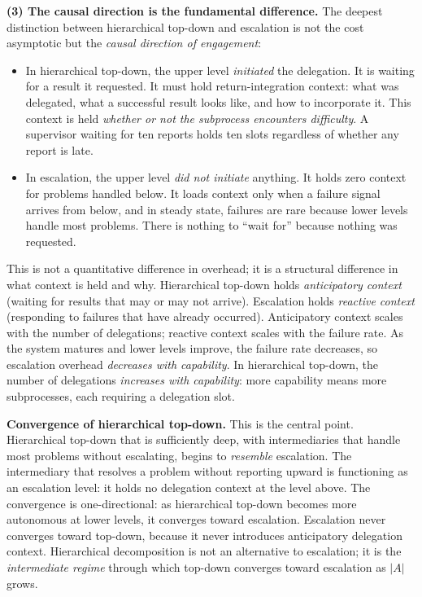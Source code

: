 \documentclass[11pt]{article}
\theoremstyle{definition}
\begin{document}
\textbf{(3) The causal direction is the fundamental difference.}
The deepest distinction between hierarchical top-down and escalation is
not the cost asymptotic but the \emph{causal direction of engagement}:

\begin{itemize}
\item In hierarchical top-down, the upper level \emph{initiated} the
   delegation. It is waiting for a result it requested. It must hold
   return-integration context: what was delegated, what a successful
   result looks like, and how to incorporate it. This context is held
   \emph{whether or not the subprocess encounters difficulty}. A
   supervisor waiting for ten reports holds ten slots regardless of
   whether any report is late.

\item In escalation, the upper level \emph{did not initiate} anything.
   It holds zero context for problems handled below. It loads context
   only when a failure signal arrives from below, and in steady
   state, failures are rare because lower levels handle most problems.
   There is nothing to ``wait for'' because nothing was requested.
\end{itemize}

This is not a quantitative difference in overhead; it is a structural
difference in what context is held and why. Hierarchical top-down holds
\emph{anticipatory context} (waiting for results that may or may not
arrive). Escalation holds \emph{reactive context} (responding to
failures that have already occurred). Anticipatory context scales with
the number of delegations; reactive context scales with the failure rate.
As the system matures and lower levels improve, the failure rate
decreases, so escalation overhead \emph{decreases with capability}. In
hierarchical top-down, the number of delegations \emph{increases with
capability}: more capability means more subprocesses, each requiring a
delegation slot.

\textbf{Convergence of hierarchical top-down.} This is the central
point. Hierarchical top-down that is sufficiently deep, with
intermediaries that handle most problems without escalating, begins to
\emph{resemble} escalation. The intermediary that resolves a problem
without reporting upward is functioning as an escalation level: it
holds no delegation context at the level above. The convergence is
one-directional: as hierarchical top-down becomes more autonomous at
lower levels, it converges toward escalation. Escalation never
converges toward top-down, because it never introduces anticipatory
delegation context. Hierarchical decomposition is not an alternative
to escalation; it is the \emph{intermediate regime} through which
top-down converges toward escalation as $|A|$ grows.
\end{document}
